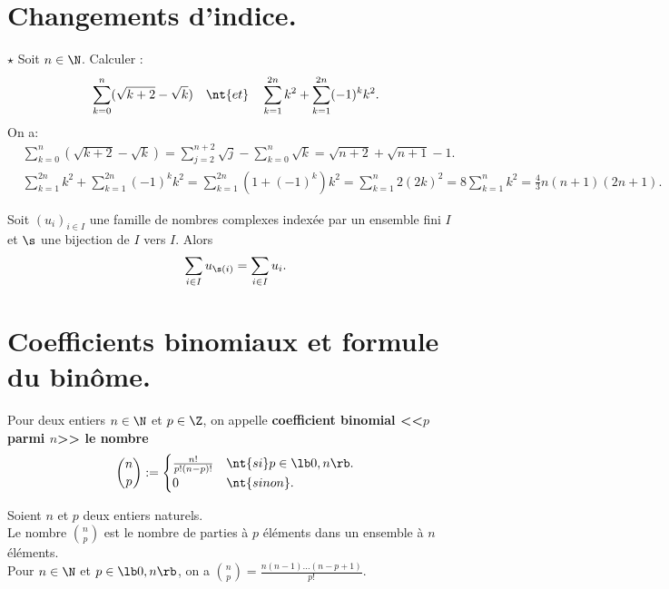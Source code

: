 \documentclass[11pt]{article}
\begin{document}
\pagebreak

\section{Changements d'indice.}

\begin{ex}{$\star$}{}
    Soit $n\in\N$. Calculer :
    \begin{equation*}
        \sum_{k=0}^n(\sqrt{k+2}-\sqrt{k})\quad\nt{et}\quad\sum_{k=1}^{2n}k^2+\sum_{k=1}^{2n}(-1)^kk^2.
    \end{equation*}
    \tcblower
    On a:
    \begin{align*}
        &\sum_{k=0}^n(\sqrt{k+2}-\sqrt{k})=\sum_{j=2}^{n+2}\sqrt{j}-\sum_{k=0}^n\sqrt{k}=\sqrt{n+2}+\sqrt{n+1}-1.\\
        &\sum_{k=1}^{2n}k^2+\sum_{k=1}^{2n}(-1)^kk^2=\sum_{k=1}^{2n}(1+(-1)^k)k^2=\sum_{k=1}^{n}2(2k)^2=8\sum_{k=1}^nk^2=\frac{4}{3}n(n+1)(2n+1).
    \end{align*}
\end{ex}

\begin{prop}{}{}
    Soit $(u_i)_{i\in I}$ une famille de nombres complexes indexée par un ensemble fini $I$ et $\s$ une bijection de $I$ vers $I$. Alors
    \begin{equation*}
        \sum_{i\in I}u_{\s(i)}=\sum_{i\in I}u_i.
    \end{equation*}
\end{prop}

\section{Coefficients binomiaux et formule du binôme.}

\begin{defi}{}{}
    Pour deux entiers $n\in\N$ et $p\in\Z$, on appelle \bf{coefficient binomial} <<$p$ parmi $n$>> le nombre
    \begin{equation*}
        \binom{n}{p}:=\begin{cases}
            \frac{n!}{p!(n-p)!} &\nt{si } p\in\lb0,n\rb.\\
            0&\nt{sinon}.
        \end{cases}
    \end{equation*}
\end{defi}

\begin{prop}{}{}
    Soient $n$ et $p$ deux entiers naturels.\\
    Le nombre $\binom{n}{p}$ est le nombre de parties à $p$ éléments dans un ensemble à $n$ éléments.\\
    Pour $n\in\N$ et $p\in\lb0,n\rb$, on a \Large$\binom{n}{p}=\frac{n(n-1)...(n-p+1)}{p!}$.
\end{prop}
\end{document}
